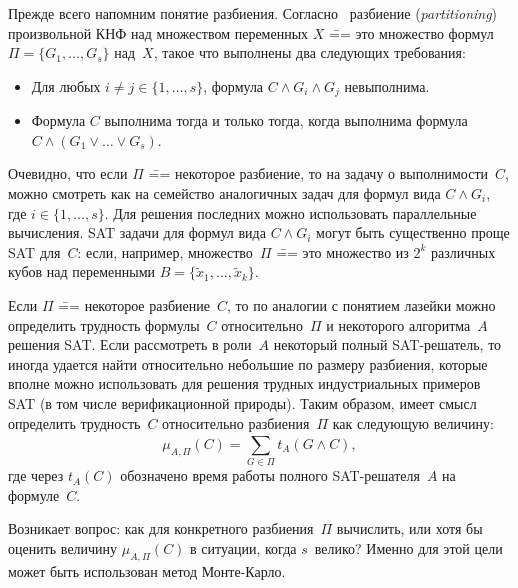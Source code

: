 Прежде всего напомним понятие разбиения.
Согласно~\cite{hyvarinen2011} разбиение (\textit{partitioning}) произвольной КНФ над множеством переменных $X$ \=== это множество формул $\Pi = \{ G_{1},\dots,G_{s} \}$ над~$X$, такое что выполнены два следующих требования:
\begin{itemize}
    \item Для любых $i \neq j \in \{ 1,\dots,s \}$, формула $C \land G_{i} \land G_{j}$ невыполнима.
    \item Формула $C$ выполнима тогда и только тогда, когда выполнима формула $C \land (G_{1} \lor \ldots \lor G_{s})$.
\end{itemize}

Очевидно, что если $\Pi$ \=== некоторое разбиение, то на задачу о выполнимости~$C$, можно смотреть как на семейство аналогичных задач для формул вида $C \land G_{i}$, где $i \in \{ 1,\dots,s \}$.
Для решения последних можно использовать параллельные вычисления.
SAT задачи для формул вида $C \land G_{i}$ могут быть существенно проще SAT для~$C$: если, например, множество~$\Pi$ \=== это множество из $2^{k}$ различных кубов над переменными $B = \{ {\widetilde{x}}_{1},\dots,{\widetilde{x}}_{k} \}$.

Если $\Pi$ \=== некоторое разбиение~$C$, то по аналогии с понятием лазейки можно определить трудность формулы~$C$ относительно~$\Pi$ и некоторого алгоритма~$A$ решения SAT.
Если рассмотреть в роли~$A$ некоторый полный SAT-решатель, то иногда удается найти относительно небольшие по размеру разбиения, которые вполне можно использовать для решения трудных индустриальных примеров SAT (в том числе верификационной природы).
Таким образом, имеет смысл определить трудность~$C$ относительно разбиения~$\Pi$ как следующую величину:
\[
    \mu_{A,\Pi}(C) = \sum_{G \in \Pi}^{}{t_{A}(G \land C)} ,
\]
где через $t_{A}(C)$ обозначено время работы полного SAT-решателя~$A$ на формуле~$C$.

Возникает вопрос: как для конкретного разбиения~$\Pi$ вычислить, или хотя бы оценить величину $\mu_{A,\Pi}(C)$ в ситуации, когда $s$~велико?
Именно для этой цели может быть использован метод Монте-Карло.

